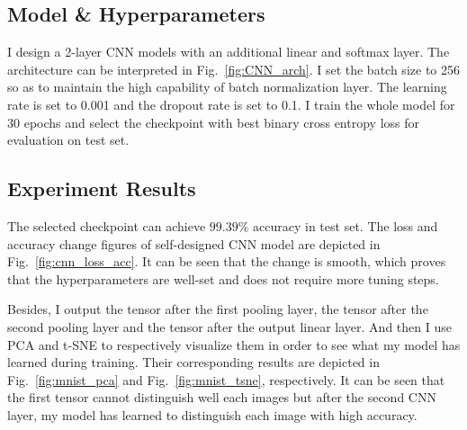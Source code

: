 \documentclass{article}
\begin{document}
\subsection{Model \& Hyperparameters}
I design a 2-layer CNN models with an additional linear and softmax layer. The architecture can be interpreted in Fig.~\ref{fig:CNN_arch}. 
I set the batch size to 256 so as to maintain the high capability of batch normalization layer. 
The learning rate is set to 0.001 and the dropout rate is set to 0.1.
I train the whole model for 30 epochs and select the checkpoint with best binary cross entropy loss for evaluation on test set.

\subsection{Experiment Results}
The selected checkpoint can achieve $99.39\%$ accuracy in test set. The loss and accuracy change figures of self-designed CNN model are depicted in Fig.~\ref{fig:cnn_loss_acc}. It can be seen that the change is smooth, which proves that the hyperparameters are well-set and does not require more tuning steps.

Besides, I output the tensor after the first pooling layer, the tensor after the second pooling layer and the tensor after the output linear layer. 
And then I use PCA and t-SNE to respectively visualize them in order to see what my model has learned during training.
Their corresponding results are depicted in Fig.~\ref{fig:mnist_pca} and Fig.~\ref{fig:mnist_tsne}, respectively.
It can be seen that the first tensor cannot distinguish well each images but after the second CNN layer, my model has learned to distinguish each image with high accuracy.
\end{document}
